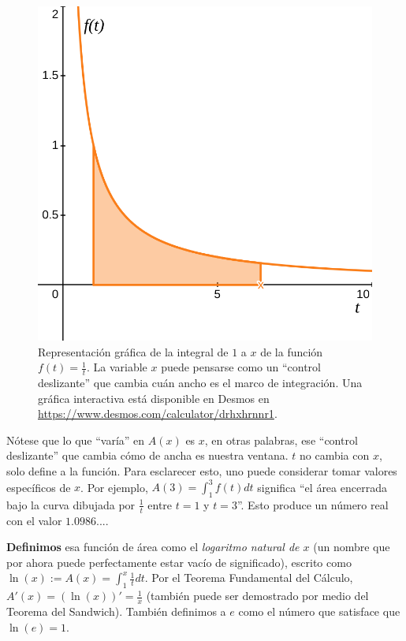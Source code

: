 \begin{figure}[H]
	\centering
	\includegraphics[width=\linewidth]{media/lnx.png}
	\caption{Representación gráfica de la integral de $1$ a $x$ de la función $f(t) = \frac{1}{t}$. La variable $x$ puede pensarse como un \enquote{control deslizante} que cambia cuán ancho es el marco de integración. Una gráfica interactiva está disponible en Desmos en \url{https://www.desmos.com/calculator/drhxhrnnr1}.}
	\label{graph}
\end{figure}

Nótese que lo que \enquote{varía} en $A(x)$ es $x$, en otras palabras, ese \enquote{control deslizante} que cambia cómo de ancha es nuestra ventana. $t$ no cambia con $x$, solo define a la función. Para esclarecer esto, uno puede considerar tomar valores específicos de $x$. Por ejemplo, $A(3) = \int_{1}^{3} f(t) dt$ significa \enquote{el área encerrada bajo la curva dibujada por $\frac{1}{t}$ entre $t = 1$ y $t = 3$}. Esto produce un número real con el valor $1.0986...$.

\textbf{Definimos} esa función de área como el \textit{logaritmo natural de $x$} (un nombre que por ahora puede perfectamente estar vacío de significado), escrito como $\ln(x) := A(x) = \int_{1}^{x} \frac{1}{t} dt$. Por el Teorema Fundamental del Cálculo, $A'(x) = (\ln(x))' = \frac{1}{x}$ (también puede ser demostrado por medio del Teorema del Sandwich). También definimos a $e$ como el número que satisface que $\ln(e) = 1$.

